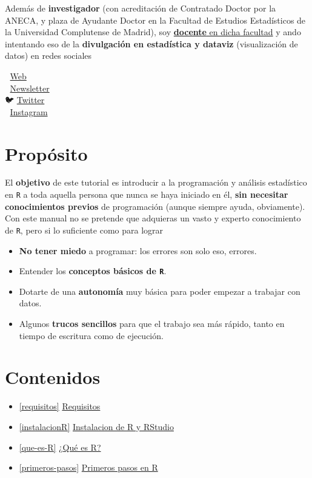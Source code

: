 \documentclass[11pt,]{book}
\providecommand{\tightlist}{%
  \setlength{\itemsep}{0pt}\setlength{\parskip}{0pt}}
\begin{document}
Además de \textbf{investigador} (con acreditación de Contratado Doctor por la ANECA, y plaza de Ayudante Doctor en la Facultad de Estudios Estadísticos de la Universidad Complutense de Madrid), soy \protect\hyperlink{docencia-impartida}{\textbf{docente} en dicha facultad} y ando intentando eso de la \textbf{divulgación en estadística y dataviz} (visualización de datos) en redes sociales

🎲 \href{https://dadosdelaplace.github.io}{Web}\\
💌 \href{https://cartasdelaplace.substack.com}{Newsletter}\\
🐦 \href{https://twitter.com/dadosdelaplace}{Twitter}\\
📸 \href{https://instagram.com/javieralvarezliebana}{Instagram}

\hypertarget{propuxf3sito}{%
\section*{Propósito}\label{propuxf3sito}}


El \textbf{objetivo} de este tutorial es introducir a la programación y análisis estadístico en \texttt{R} a toda aquella persona que nunca se haya iniciado en él, \textbf{sin necesitar conocimientos previos} de programación (aunque siempre ayuda, obviamente). Con este manual no se pretende que adquieras un vasto y experto conocimiento de \texttt{R}, pero si lo suficiente como para lograr

\begin{itemize}
\tightlist
\item
  \textbf{No tener miedo} a programar: los errores son solo eso, errores.
\item
  Entender los \textbf{conceptos básicos de \texttt{R}}.
\item
  Dotarte de una \textbf{autonomía} muy básica para poder empezar a trabajar con datos.
\item
  Algunos \textbf{trucos sencillos} para que el trabajo sea más rápido, tanto en tiempo de escritura como de ejecución.
\end{itemize}

\hypertarget{contenidos}{%
\section*{Contenidos}\label{contenidos}}


\begin{itemize}
\tightlist
\item
  \ref{requisitos} \protect\hyperlink{requisitos}{Requisitos}
\item
  \ref{instalacionR} \protect\hyperlink{instalacionR}{Instalacion de R y RStudio}
\item
  \ref{que-es-R} \protect\hyperlink{que-es-R}{¿Qué es R?}
\item
  \ref{primeros-pasos} \protect\hyperlink{primeros-pasos}{Primeros pasos en R}
\end{itemize}
\end{document}
